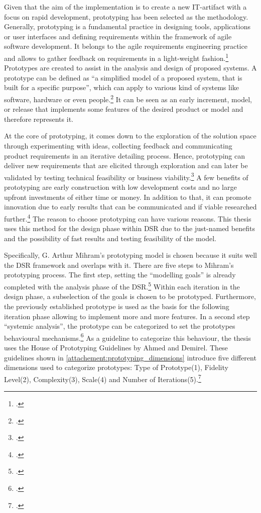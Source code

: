 Given that the aim of the implementation is to create a new \ac{IT}-artifact with a focus on rapid development, prototyping has been selected as the methodology.
Generally, prototyping is a fundamental practice in designing tools, applications or user interfaces and defining requirements within the framework of agile software development.
It belongs to the agile requirements engineering practice and allows to gather feedback on requirements in a light-weight fashion.\footcite[cf.][1]{bjarnasonModelSoftwarePrototyping2021a}
Prototypes are created to assist in the analysis and design of proposed systems.
A prototype can be defined as ``a simplified model of a proposed system, that is built for a specific purpose'', which can apply to various kind of systems like software, hardware or even people.\footcite[][470]{luqiRapidSoftwarePrototyping1992}
It can be seen as an early increment, model, or release that implements some features of the desired product or model and therefore represents it. 

At the core of prototyping, it comes down to the exploration of the solution space through experimenting with ideas,
collecting feedback and
communicating product requirements in an iterative detailing process.
Hence, prototyping can deliver new requirements that are elicited through exploration and can later be validated 
by testing technical feasibility or business viability.\footcite[cf.][8]{bjarnasonModelSoftwarePrototyping2021a}
A few benefits of prototyping are early construction with low development costs and no large upfront investments of either time or money.
In addition to that, it can promote innovation due to early results that can be communicated and if viable researched further.\footcite[cf.][25]{nelsonSoftwarePrototyping2016}
The reason to choose prototyping can have various reasons. 
This thesis uses this method for the design phase within \ac{DSR} due to the just-named benefits and the possibility of fast results and testing feasibility of the model.

Specifically, G. Arthur Mihram's prototyping model is chosen because it suits well the \ac{DSR} framework and overlaps with it. 
There are five steps to Mihram's prototyping process.
The first step, setting the ``modelling goals'' is already completed with the analysis phase of the \ac{DSR}.\footcite[cf.][71]{mihramSimulationMethodology1976}
Within each iteration in the design phase, a subselection of the goals is chosen to be prototyped. 
Furthermore, the previously established prototype is used as the basis for the following iteration phase allowing to implement more and more features.
In a second step ``systemic analysis'', the prototype can be categorized to set the prototypes behavioural mechanisms.\footcite[cf.][71-72]{mihramSimulationMethodology1976}
As a guideline to categorize this behaviour, the thesis uses the House of Prototyping Guidelines by Ahmed and Demirel.
These guidelines shown in \ref{attachement:prototyping_dimensions} introduce five different dimensions used to categorize prototypes:
Type of Prototype(1), Fidelity Level(2), Complexity(3), Scale(4) and Number of Iterations(5).\footcite[cf.][6-7]{ahmedPrototypingFrameworkHumanCentered2021}

